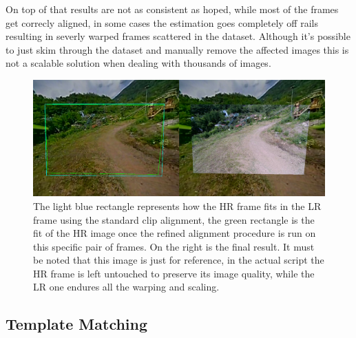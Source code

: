 On top of that results are not as consistent as hoped, while most of the frames get correcly aligned, in some cases the estimation goes completely off rails resulting in severly warped frames scattered in the dataset. Although it's possible to just skim through the dataset and manually remove the affected images this is not a scalable solution when dealing with thousands of images.

\begin{figure}[H]
  \centering
  \includegraphics[scale=1.2]{figures/deep_match_sbs.png}
  \caption{The light blue rectangle represents how the HR frame fits in the LR frame using the standard clip alignment, the green rectangle is the fit of the HR image once the refined alignment procedure is run on this specific pair of frames. On the right is the final result. It must be noted that this image is just for reference, in the actual script the HR frame is left untouched to preserve its image quality, while the LR one endures all the warping and scaling.}
  \label{img:deep_match}
\end{figure}

\subsection {Template Matching}
\label{subsec:template_match}

